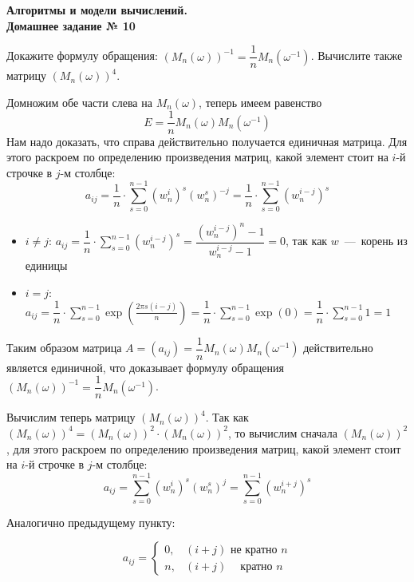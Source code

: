 \documentclass[a4paper,12pt]{article}
\begin{document}
	
	\thispagestyle{firstpage}
	
	\begin{center}
		\textbf{\Large{Алгоритмы и модели вычислений. \\ Домашнее задание № 10}}
	\end{center}
	
\begin{task}
Докажите формулу обращения: $(M_n(\omega))^{-1} = \dfrac{1}{n}M_n(\omega^{-1})$. Вычислите также матрицу $(M_n(\omega))^4$.
\end{task}

\begin{solution}
	Домножим обе части слева на  $M_n(\omega)$, теперь имеем равенство \[E = \dfrac{1}{n} M_n(\omega) M_n(\omega^{-1}) \] Нам надо доказать, что справа действительно получается единичная матрица. Для этого раскроем по определению произведения матриц, какой элемент стоит на $i$-й строчке в $j$-м столбце: \[a_{ij} = \dfrac1n \cdot \displaystyle \sum_{s = 0}^{n-1} (w_{n}^i)^s (w_{n}^{s})^{-j} = \dfrac1n \cdot \displaystyle \sum_{s = 0}^{n-1} (w_{n}^{i-j})^s \]
	
	\begin{itemize}
		\item $i \ne j$: $a_{ij} = \dfrac1n \cdot \displaystyle \sum_{s = 0}^{n-1} (w_{n}^{i-j})^s = \dfrac{(w_{n}^{i-j})^n - 1}{w_{n}^{i-j} - 1} = 0$, так как $w$~---~корень из единицы
		\item $i = j$: $a_{ij} = \dfrac1n \cdot \displaystyle \sum_{s = 0}^{n-1} \exp\left(\frac{2\pi s (i-j)}{n}\right) = \dfrac1n \cdot \displaystyle \sum_{s = 0}^{n-1} \exp(0) = \dfrac1n \cdot \displaystyle \sum_{s = 0}^{n-1} 1 = 1$
	\end{itemize}

	Таким образом матрица $A = (a_{ij}) = \dfrac{1}{n} M_n(\omega) M_n(\omega^{-1})$ действительно является единичной, что доказывает формулу обращения $(M_n(\omega))^{-1} = \dfrac{1}{n}M_n(\omega^{-1})$.


Вычислим теперь матрицу $(M_n(\omega))^4$. Так как $(M_n(\omega))^4 = (M_n(\omega))^2 \cdot (M_n(\omega))^2$, то вычислим сначала $(M_n(\omega))^2$, для этого раскроем по определению произведения матриц, какой элемент стоит на $i$-й строчке в $j$-м столбце: \[a_{ij} = \displaystyle \sum_{s = 0}^{n-1} (w_{n}^i)^s (w_{n}^{s})^{j} = \displaystyle \sum_{s = 0}^{n-1} (w_{n}^{i+j})^s\]

Аналогично предыдущему пункту:

\begin{equation*}
a_{ij} =
\left\{
\begin{array}{lr}
0, & (i+j) \text{ не кратно } n\\
n, & (i+j) \ \ \ \ \text{ кратно } n
\end{array}
\right.
\end{equation*}


\end{solution}
\end{document}
